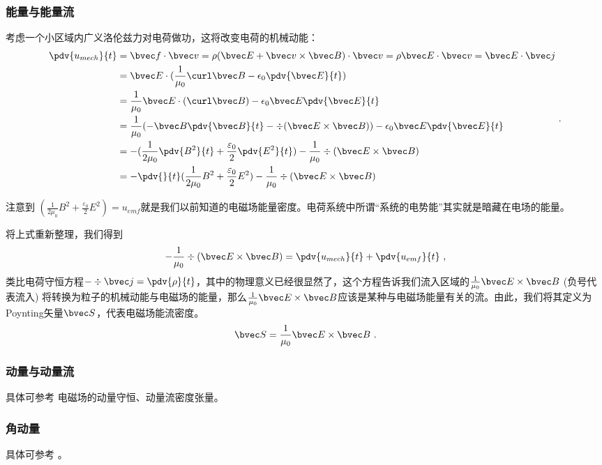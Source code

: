 \subsubsection{能量与能量流} 
考虑一个小区域内广义洛伦兹力对电荷做功，这将改变电荷的机械动能：
$$
\begin{aligned}
\pdv{u_{mech}}{t} &= \bvec f \cdot \bvec v = \rho (\bvec E + \bvec v \times \bvec B)\cdot \bvec v = \rho \bvec E \cdot \bvec v = \bvec E \cdot \bvec j \\
 & = \bvec E \cdot (\frac{1}{\mu_0} \curl \bvec B - \epsilon_0 \pdv{\bvec E}{t})\\
 & = \frac{1}{\mu_0} \bvec E \cdot (\curl \bvec B) - \epsilon_0 \bvec E \pdv{\bvec E}{t}\\
 & = \frac{1}{\mu_0} (-\bvec B \pdv{\bvec B}{t} - \div(\bvec E \times \bvec B))- \epsilon_0 \bvec E \pdv{\bvec E}{t}\\
 & = - (\frac{1}{2\mu_0} \pdv{B^2}{t} + \frac{\varepsilon_0}{2} \pdv{E^2}{t}) - \frac{1}{\mu_0} \div(\bvec E \times \bvec B)\\
 & = - \pdv{}{t} (\frac{1}{2\mu_0} B^2 + \frac{\varepsilon_0}{2} E^2) - \frac{1}{\mu_0} \div(\bvec E \times \bvec B)
\end{aligned}
~.
$$

注意到 $(\frac{1}{2\mu_0} B^2 + \frac{\varepsilon_0}{2} E^2) = u_{emf}$就是我们以前知道的电磁场能量密度。电荷系统中所谓“系统的电势能”其实就是暗藏在电场的能量。

将上式重新整理，我们得到
$$
- \frac{1}{\mu_0} \div(\bvec E \times \bvec B) = \pdv{u_{mech}}{t} + \pdv{u_{emf}}{t}~,
$$
类比电荷守恒方程$-\div \bvec j = \pdv{\rho}{t}$，其中的物理意义已经很显然了，这个方程告诉我们流入区域的$\frac{1}{\mu_0} \bvec E \times \bvec B$ (负号代表流入) 将转换为粒子的机械动能与电磁场的能量，那么$ \frac{1}{\mu_0} \bvec E \times \bvec B$应该是某种与电磁场能量有关的流。由此，我们将其定义为Poynting矢量$\bvec S$，代表电磁场能流密度。
$$
\bvec S = \frac{1}{\mu_0} \bvec E \times \bvec B~.
$$

\subsubsection{动量与动量流}
具体可参考 电磁场的动量守恒、动量流密度张量。

\subsubsection{角动量}
具体可参考 \cite{GriffE}。

